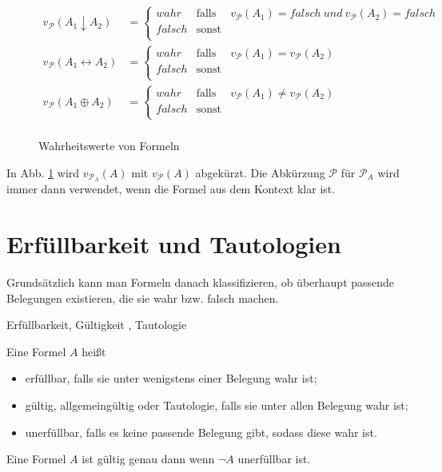 \begin{figure}[ !h]
\begin{align*}
v_\mathcal{P}(A_1 \downarrow A_2)  &= \left\{ \begin{array}{lll}
wahr & \mbox{falls}& v_\mathcal{P}(A_1) = falsch \ und \ v_\mathcal{P}(A_2) = falsch \\ 
falsch & \mbox{sonst} & \\
\end{array}\right.\\
v_\mathcal{P}(A_1 \leftrightarrow A_2)  &= \left\{ \begin{array}{lll}
wahr & \mbox{falls}& v_\mathcal{P}(A_1) = v_\mathcal{P}(A_2) \\ 
falsch & \mbox{sonst} & \\
\end{array}\right.\\
v_\mathcal{P}(A_1 \oplus A_2)  &= \left\{ \begin{array}{lll}
wahr & \mbox{falls}& v_\mathcal{P}(A_1) \neq v_\mathcal{P}(A_2) \\ 
falsch & \mbox{sonst} & \\
\end{array}\right.\\
\end{align*}
 \caption[Wahrheitswerte von Formeln]{Wahrheitswerte von Formeln}	 
 \label{Abb. 2.3}
\end{figure}

In Abb. \ref{Abb. 2.3} wird $v_{\mathcal{P}_A} (A)$ mit $v_\mathcal{P}(A)$ abgekürzt. Die Abkürzung $\mathcal{P}$ für $\mathcal{P}_A$ wird immer dann verwendet, wenn die Formel aus dem Kontext klar ist.
\section{Erfüllbarkeit und Tautologien}
Grundsätzlich kann man Formeln danach klassifizieren, ob überhaupt passende Belegungen existieren, die sie wahr bzw. falsch machen.
\begin{defi} Erfüllbarkeit, Gültigkeit , Tautologie \label{Definition 2.38} \end{defi}  Eine Formel $A$ heißt
\begin{itemize}																					
\item erfüllbar, falls sie unter wenigstens einer Belegung wahr ist;
\item gültig, allgemeingültig oder Tautologie, falls sie unter allen Belegung wahr ist;
\item unerfüllbar, falls es keine passende Belegung gibt, sodass diese wahr ist.
\end{itemize}
\begin{bem} \label{Satz 2.39} \end{bem}Eine Formel $A$ ist gültig genau dann wenn $\neg A$ unerfüllbar ist.

